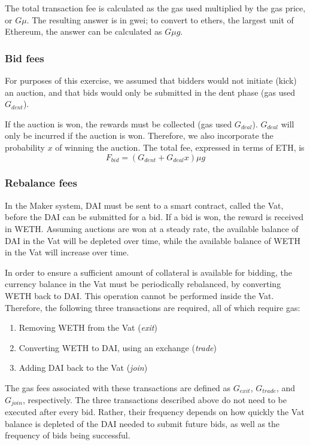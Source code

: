 \documentclass[conference]{IEEEtran}
\begin{document}
The total transaction fee is calculated as the gas used multiplied by the gas price, or $G  \mu$. The resulting answer is in gwei; to convert to ethers, the largest unit of Ethereum, the answer can be calculated as $G \mu g$.

\subsubsection{Bid fees}
For purposes of this exercise, we assumed that bidders would not initiate (kick) an auction, and that bids would only be submitted in the dent phase (gas used $G_{dent}$).

If the auction is won, the rewards must be collected (gas used $G_{deal}$). $G_{deal}$ will only be incurred if the auction is won. Therefore, we also incorporate the probability $x$ of winning the auction. The total fee, expressed in terms of ETH, is 
\begin{equation}
    F_{bid} = (G_{dent} + G_{deal} x) \mu g 
\end{equation}

\subsubsection{Rebalance fees}
In the Maker system, DAI must be sent to a smart contract, called the Vat, before the DAI can be submitted for a bid. If a bid is won, the reward is received in WETH. Assuming auctions are won at a steady rate, the available balance of DAI in the Vat will be depleted over time, while the available balance of WETH in the Vat will increase over time.

In order to ensure a sufficient amount of collateral is available for bidding, the currency balance in the Vat must be periodically rebalanced, by converting WETH back to DAI. This operation cannot be performed inside the Vat. Therefore, the following three transactions are required, all of which require gas:
\begin{enumerate}
    \item Removing WETH from the Vat (\emph{exit})
    \item Converting WETH to DAI, using an exchange (\emph{trade})
    \item Adding DAI back to the Vat (\emph{join})
\end{enumerate}

The gas fees associated with these transactions are defined as $G_{exit}$, $G_{trade}$, and $G_{join}$, respectively. The three transactions described above do not need to be executed after every bid. Rather, their frequency depends on how quickly the Vat balance is depleted of the DAI needed to submit future bids, as well as the frequency of bids being successful.
\end{document}
